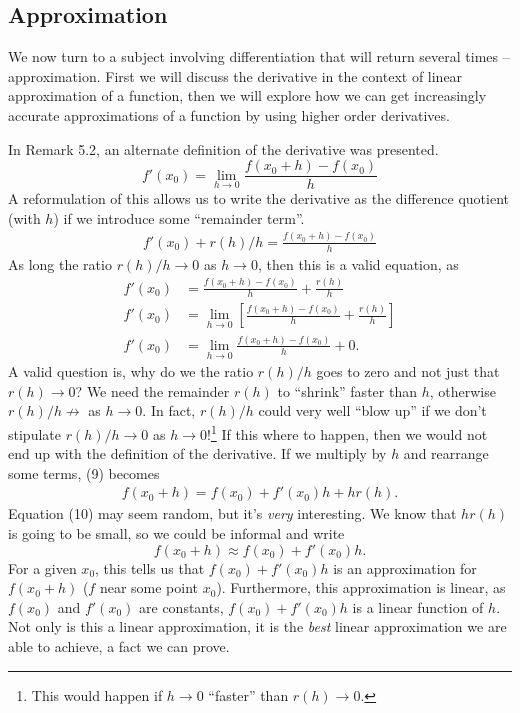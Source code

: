 \documentclass{article}
\theoremstyle{definition}
\begin{document}
	\subsection{Approximation}
	We now turn to a subject involving differentiation that will return several times -- approximation. First we will discuss the derivative in the context of linear approximation of a function, then we will explore how we can get increasingly accurate approximations of a function by using higher order derivatives.
	
	In Remark 5.2, an alternate definition of the derivative was presented. $$f'(x_0)=\lim\limits_{h\to 0}\frac{f(x_0+h)-f(x_0)}{h}$$ A reformulation of this allows us to write the derivative as the difference quotient (with $ h $) if we introduce some ``remainder term''. 
	\begin{align}
		f'(x_0)+r(h)/h=\frac{f(x_0+h)-f(x_0)}{h}
	\end{align}
	As long the ratio $ r(h)/h\to 0 $ as $ h\to 0 $, then this is a valid equation, as \begin{align*}
		f'(x_0)&=\frac{f(x_0+h)-f(x_0)}{h}+\frac{r(h)}{h}\\
		f'(x_0)&= \lim\limits_{h\to 0}\left[\frac{f(x_0+h)-f(x_0)}{h} + \frac{r(h)}{h}\right]\\
		f'(x_0)&= \lim\limits_{h\to 0}\frac{f(x_0+h)-f(x_0)}{h}+0.
	\end{align*}
	A valid question is, why do we the ratio $ r(h)/h $ goes to zero and not just that $ r(h)\to 0 $? We need the remainder $ r(h) $ to ``shrink'' faster than $ h $, otherwise $ r(h)/h\not\to $ as $ h\to 0 $. In fact, $ r(h)/h $ could very well ``blow up'' if we don't stipulate $ r(h)/h\to 0 $ as $ h\to 0 $!\footnote{This would happen if $ h\to 0 $ ``faster'' than $ r(h)\to 0 $.} If this where to happen, then we would not end up with the definition of the derivative. If we multiply by $ h $ and rearrange some terms, (9) becomes 
	\begin{align}
		f(x_0+h)=f(x_0)+f'(x_0)h+hr(h).
	\end{align}
	Equation (10) may seem random, but it's \textit{very} interesting. We know that $ hr(h) $ is going to be small, so we could be informal and write $$ f(x_0+h)\approx f(x_0)+f'(x_0)h. $$ For a given $ x_0 $, this tells us that $ f(x_0)+f'(x_0)h $ is an approximation for $ f(x_0+h) $ ($ f $ near some point $ x_0 $). Furthermore, this approximation is linear, as $ f(x_0) $ and $ f'(x_0) $ are constants, $ f(x_0)+f'(x_0)h $ is a linear function of $ h $. Not only is this a linear approximation, it is the \textit{best} linear approximation we are able to achieve, a fact we can prove.
\end{document}
